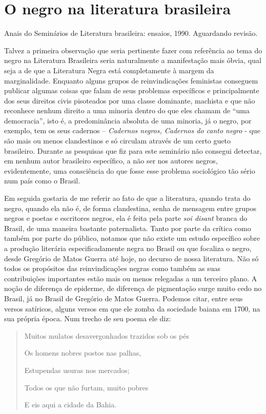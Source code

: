 \documentclass[
  letterpaper,
  DIV=11,
  numbers=noendperiod]{scrreprt}
\begin{document}
\chapter{O negro na literatura
brasileira}\label{o-negro-na-literatura-brasileira}

Anais do Seminários de Literatura brasileira: ensaios, 1990. Aguardando
revisão.

\hfill\break

Talvez a primeira observação que seria pertinente fazer com referência
ao tema do negro na Literatura Brasileira seria naturalmente a
manifestação mais óbvia, qual seja a de que a Literatura Negra está
completamente à margem da marginalidade. Enquanto alguns grupos de
reinvindicações feministas conseguem publicar algumas coisas que falam
de seus problemas específicos e principalmente dos seus direitos civis
pisoteados por uma classe dominante, machista e que não reconhece nenhum
direito a uma minoria dentro do que eles chamam de ``uma democracia'',
isto é, a predominância absoluta de uma minoria, já o negro, por
exemplo, tem os seus cadernos -- \emph{Cadernos negros, Cadernos do
canto negro} - que são mais ou menos clandestinos e só circulam através
de um certo gueto brasileiro. Durante as pesquisas que fiz para este
seminário não consegui detectar, em nenhum autor brasileiro específico,
a não ser nos autores negros, evidentemente, uma consciência do que
fosse esse problema sociológico tão sério num país como o Brasil.

Em seguida gostaria de me referir ao fato de que a literatura, quando
trata do negro, quando ela não é, de forma clandestina, senha de
mensagem entre grupos negros e poetas e escritores negros, ela é feita
pela parte \emph{soi disant} branca do Brasil, de uma maneira bastante
paternalista. Tanto por parte da crítica como também por parte do
público, notamos que não existe um estudo específico sobre a produção
literária especificadamente negra no Brasil ou que focaliza o negro,
desde Gregório de Matos Guerra até hoje, no decurso de nossa literatura.
Não só todos os propósitos das reinvindicações negras como também as
suas contribuições importantes estão mais ou menos relegadas a um
terceiro plano. A noção de diferença de epiderme, de diferença de
pigmentação surge muito cedo no Brasil, já no Brasil de Gregório de
Matos Guerra. Podemos citar, entre seus versos satíricos, alguns versos
em que ele zomba da sociedade baiana em 1700, na sua própria época. Num
trecho de seu poema ele diz:

\begin{quote}
Muitos mulatos desavergonhados trazidos sob os pés~

Os homens nobres postos nas palhas,~

Estupendas usuras nos mercados;~

Todos os que não furtam, muito pobres~

E eis aqui a cidade da Bahia.
\end{quote}
\end{document}
